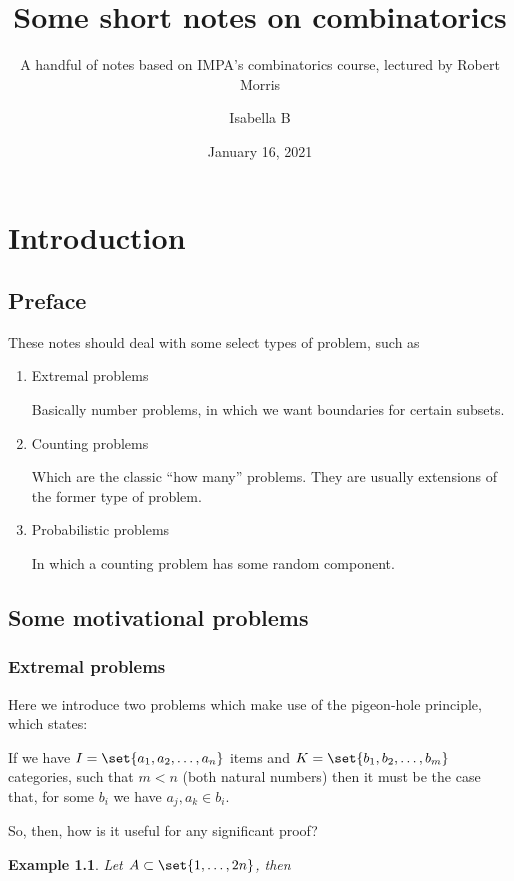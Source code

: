 \documentclass[english, dark, index]{Iart}
\title{Some short notes on combinatorics}
\subtitle{A handful of notes based on IMPA's combinatorics course, lectured by Robert Morris}
\date{January 16, 2021}
\author{Isabella B}
\newtheorem{example}{Example}[chapter]
\begin{document}
	
	\maketitle
	
	\part{Introduction}
	
	\chapter*{Preface}
	
	These notes should deal with some select types of problem, such as
	\begin{enumerate}
		\item Extremal problems
		
		Basically number problems, in which we want boundaries for certain subsets.
		
		\item Counting problems
		
		Which are the classic ``how many'' problems. They are usually extensions of the former type of problem.
		
		\item Probabilistic problems
		
		In which a counting problem has some random component.
	\end{enumerate}

	\chapter{Some motivational problems}
	
	\section{Extremal problems}
	
	Here we introduce two problems which make use of the pigeon-hole principle, which states:
	
	If we have $ I=\set{a_1,a_2,\ldots,a_n} $ items and $ K=\set{b_1,b_2,\ldots,b_m} $ categories, such that $ m<n $ (both natural numbers) then it must be the case that, for some $ b_i $ we have $ a_j,a_k\in b_i $.
	
	So, then, how is it useful for any significant proof?
	
	\begin{example}
		Let $ A\subset \set{1,\ldots,2n} $, then
	\end{example}
	
\end{document}
